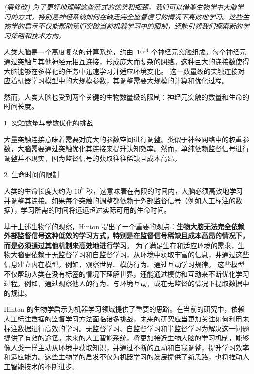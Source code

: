 {\em (需修改) 为了更好地理解这些范式的优势和瓶颈，我们可以借鉴生物学中大脑学习的方式，特别是神经系统如何在缺乏完全监督信号的情况下高效地学习。这些生物学的启示不仅能帮助我们突破当前机器学习中的限制，还能引领我们探索新的学习策略和技术方向。

人类大脑是一个高度复杂的计算系统，约由~${10}^{14}$  个神经元突触组成。每个神经元通过突触与其他神经元相互连接，形成庞大而复杂的网络。这种巨大的连接数使得大脑能够在多样化的任务中迅速学习并适应环境变化。
这一数量级的突触连接对应着机器学习模型中的大规模参数，其调整需要大规模的计算和优化过程。

然而，人类大脑也受到两个关键的生物数量级的限制：神经元突触的数量和生命的时间长度。\cite{Hinton}

1. 突触数量与参数优化的挑战

大量突触连接意味着需要对庞大的参数空间进行调整。类似于神经网络中的权重参数，大脑需要通过突触优化其连接来提升认知效率。然而，单纯依赖监督信号进行调整并不现实，因为监督信号的获取往往稀缺且成本高昂。

2. 生命时间的限制

人类的生命长度大约为 $10^9$ 秒，这意味着在有限的时间内，大脑必须高效地学习并调整其连接。如果每个突触的调整都依赖于外部监督信号（例如人工标注的数据），学习所需的时间将远远超过实际可用的生命时间。

基于上述生物学的观察，Hinton 提出了一个重要的观点：{\bf 生物大脑无法完全依赖外部监督信号这种低效的学习方式，特别是在监督信号稀缺且成本高昂的情况下，而是必须通过其他机制来高效地进行学习}。
为了满足生存和适应环境的需求，生物大脑更依赖于无监督学习和自监督学习，从环境中获取丰富的信息，并通过这些信息建立内在模型。例如，观察世界、模仿行为、通过互动学习规律。
这些模型不仅帮助人类在没有标签的情况下理解世界，还能通过模仿和互动来不断优化学习过程。例如，通过观察他人的行为、与环境互动，或在无监督的情况下提取数据中的规律。


Hinton 的生物学启示为机器学习领域提供了重要的思路。在当前的研究中，依赖人工标注数据的监督学习方法面临诸多挑战，未来的研究应当更加关注如何利用未标注数据进行高效的学习。无监督学习、自监督学习和半监督学习为解决这一问题提供了有效的途径。未来的人工智能系统，将更加接近生物大脑的学习机制，能够像人类一样主动从环境中获取知识，并通过不断的互动和自我调整，提升学习效率和适应能力。这些生物学的启发不仅为机器学习的发展提供了新思路，也将推动人工智能技术的不断进步。}


%
%
%
%

